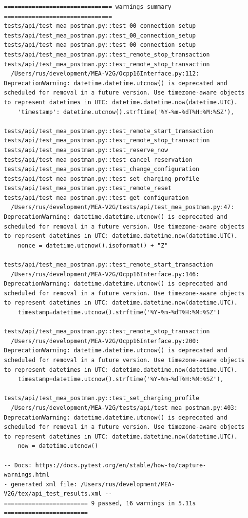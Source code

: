 \documentclass{article}
\begin{document}
\begin{lstlisting}
=============================== warnings summary ===============================
tests/api/test_mea_postman.py::test_00_connection_setup
tests/api/test_mea_postman.py::test_00_connection_setup
tests/api/test_mea_postman.py::test_00_connection_setup
tests/api/test_mea_postman.py::test_remote_stop_transaction
tests/api/test_mea_postman.py::test_remote_stop_transaction
  /Users/rus/development/MEA-V2G/Ocpp16Interface.py:112: DeprecationWarning: datetime.datetime.utcnow() is deprecated and scheduled for removal in a future version. Use timezone-aware objects to represent datetimes in UTC: datetime.datetime.now(datetime.UTC).
    'timestamp': datetime.utcnow().strftime('%Y-%m-%dT%H:%M:%SZ'),

tests/api/test_mea_postman.py::test_remote_start_transaction
tests/api/test_mea_postman.py::test_remote_stop_transaction
tests/api/test_mea_postman.py::test_reserve_now
tests/api/test_mea_postman.py::test_cancel_reservation
tests/api/test_mea_postman.py::test_change_configuration
tests/api/test_mea_postman.py::test_set_charging_profile
tests/api/test_mea_postman.py::test_remote_reset
tests/api/test_mea_postman.py::test_get_configuration
  /Users/rus/development/MEA-V2G/tests/api/test_mea_postman.py:47: DeprecationWarning: datetime.datetime.utcnow() is deprecated and scheduled for removal in a future version. Use timezone-aware objects to represent datetimes in UTC: datetime.datetime.now(datetime.UTC).
    nonce = datetime.utcnow().isoformat() + "Z"

tests/api/test_mea_postman.py::test_remote_start_transaction
  /Users/rus/development/MEA-V2G/Ocpp16Interface.py:146: DeprecationWarning: datetime.datetime.utcnow() is deprecated and scheduled for removal in a future version. Use timezone-aware objects to represent datetimes in UTC: datetime.datetime.now(datetime.UTC).
    timestamp=datetime.utcnow().strftime('%Y-%m-%dT%H:%M:%SZ')

tests/api/test_mea_postman.py::test_remote_stop_transaction
  /Users/rus/development/MEA-V2G/Ocpp16Interface.py:200: DeprecationWarning: datetime.datetime.utcnow() is deprecated and scheduled for removal in a future version. Use timezone-aware objects to represent datetimes in UTC: datetime.datetime.now(datetime.UTC).
    timestamp=datetime.utcnow().strftime('%Y-%m-%dT%H:%M:%SZ'),

tests/api/test_mea_postman.py::test_set_charging_profile
  /Users/rus/development/MEA-V2G/tests/api/test_mea_postman.py:403: DeprecationWarning: datetime.datetime.utcnow() is deprecated and scheduled for removal in a future version. Use timezone-aware objects to represent datetimes in UTC: datetime.datetime.now(datetime.UTC).
    now = datetime.utcnow()

-- Docs: https://docs.pytest.org/en/stable/how-to/capture-warnings.html
- generated xml file: /Users/rus/development/MEA-V2G/tex/api_test_results.xml --
======================== 9 passed, 16 warnings in 5.11s ========================
\end{lstlisting}
\end{document}
